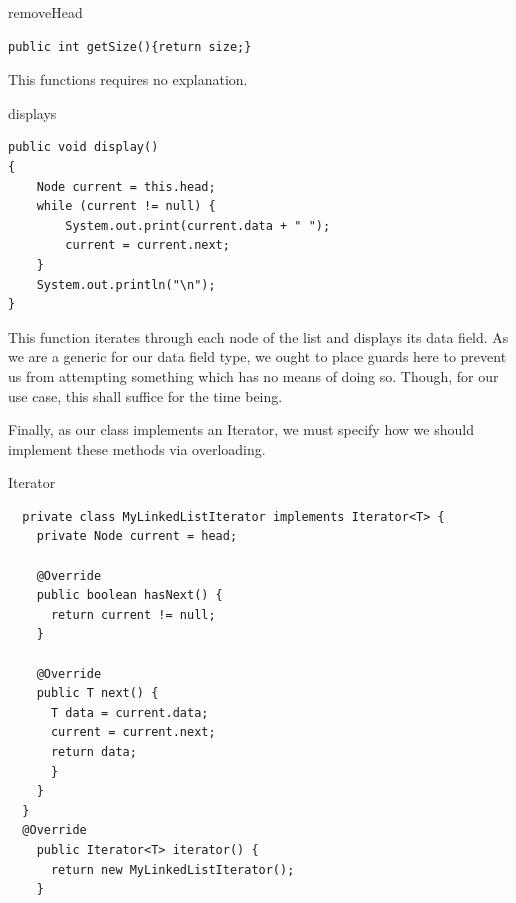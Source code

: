 \documentclass[a4paper]{article}
\begin{document}
\begin{algorithm}
\caption{removeHead}\label{euclid}
\begin{verbatim}
public int getSize(){return size;}
\end{verbatim}
\end{algorithm}

This functions requires no explanation.






\begin{algorithm}
\caption{displays}\label{euclid}
\begin{verbatim}
public void display()
{
    Node current = this.head;
    while (current != null) {
        System.out.print(current.data + " ");
        current = current.next;
    }
    System.out.println("\n");
}
\end{verbatim}
\end{algorithm}

This function iterates through each node of the list 
and displays its data field. As we are a generic for our
data field type, we ought to place guards here to prevent 
us from attempting something which has no means of doing so.
Though, for our use case, this shall suffice for the time being.

\newpage



Finally, as our class implements an Iterator, we must specify 
how we should implement these methods via overloading.


\vspace{6mm}
\makeatletter
\renewcommand{\ALG@name}{Nested Class}
\makeatother
\setcounter{algorithm}{1}


\begin{algorithm}
\caption{Iterator}\label{euclid}
\begin{verbatim}
  private class MyLinkedListIterator implements Iterator<T> {
    private Node current = head;

    @Override
    public boolean hasNext() {
      return current != null;
    }

    @Override
    public T next() {
      T data = current.data;
      current = current.next;
      return data;
      }
    }
  }
  @Override
    public Iterator<T> iterator() {
      return new MyLinkedListIterator();
    }
\end{verbatim}
\end{algorithm}
\vspace{8mm}
\end{document}

